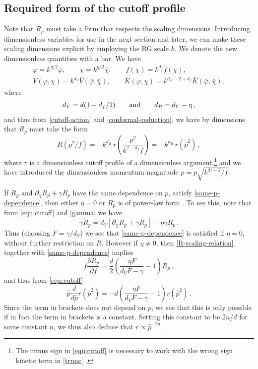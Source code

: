 \documentclass[11pt]{book} %
\newcommand{\be}{\begin{equation}}
\newcommand{\ee}{\end{equation}}
\begin{document}

\subsection{Required form of the cutoff profile}\label{sec:required-cutoff}

Note that $R_p$ must take a form that respects the scaling dimensions. Introducing dimensionless variables for use in the next section and later, we can make these scaling dimensions explicit by employing the RG scale $k$. %
We denote the new dimensionless quantities with a bar. We have
\begin{align}
\label{dim-vars}
	\varphi = k^{\eta/2}\bar\varphi, \qquad\chi = k^{\eta/2}\bar\chi, \qquad f(\chi) = k^{d_f}\bar f(\chi),\nonumber\\
	V(\varphi,\chi) = k^{d_V}\bar V(\bar\varphi,\bar\chi), \qquad K(\varphi, \chi) = k^{d_R- 2 + d_f} \bar  K(\bar\varphi,\bar\chi),
\end{align}
where 
\be 
\label{dimensions}
d_V = d(1-d_f/2)\qquad{\rm and}\qquad d_R = d_V - \eta\,,
\ee 
and thus from \eqref{cutoff-action} and \eqref{conformal-reduction}, we have by dimensions that $R_p$ must take the form
\begin{equation}
\label{equ:cutoff}
	R(p^2/f)= - k^{d_R} \,r\left(\frac{p^2}{k^{2-d_f}f}\right) = - k^{d_R} \,r(\hat p^2) \,,
\end{equation}
where $r$ is a dimensionless cutoff profile of a dimensionless argument,\footnote{The minus sign in \eqref{equ:cutoff} is necessary to work with the wrong sign kinetic term in \eqref{trunc} \cite{Dietz:2015owa}.} and we have introduced the dimensionless momentum magnitude $\hat p = p\sqrt{k^{d_f-2}/f}$. 

If $\dot R_p$ and $\partial_{\chi} R_p + \gamma R_p$ have the same dependence on $p$, \ie satisfy \eqref{same-p-dependence}, then either $\eta=0$ or $R_p$ is of power-law form \cite{Dietz:2015owa}. To see this, note that from \eqref{equ:cutoff} and \eqref{gamma} we have
\be
\label{R-scaling-relation}
\gamma {\dot R}_p = d_V \left[\partial_\chi R_p+\gamma R_p\right] -\eta \gamma R_p\,.
\ee
Thus (choosing $F=\gamma/d_V$) we see that \eqref{same-p-dependence} is satisfied if $\eta=0$, without further restriction on $R$. However if $\eta\ne0$, then \eqref{R-scaling-relation} together with \eqref{same-p-dependence} implies
\be 
f \frac{\partial R_p}{\partial f} = \frac{d}{2}\left( \frac{\eta F}{ d_VF- \gamma} - 1\right) R_p\,,
\ee
and thus from \eqref{equ:cutoff}
\be 
\hat{p} \frac{d}{d\hat{p}} r(\hat{p}^2) = -d\left( \frac{\eta F}{ d_VF- \gamma} - 1\right) r(\hat{p}^2)\,.
\ee
Since the term in brackets does not depend on $p$, we see that this is only possible if in fact the term in brackets is a constant. Setting this constant to be $2n/d$ for some constant $n$, we thus also deduce that $r\propto \hat{p}^{-2n}$.
\end{document}
